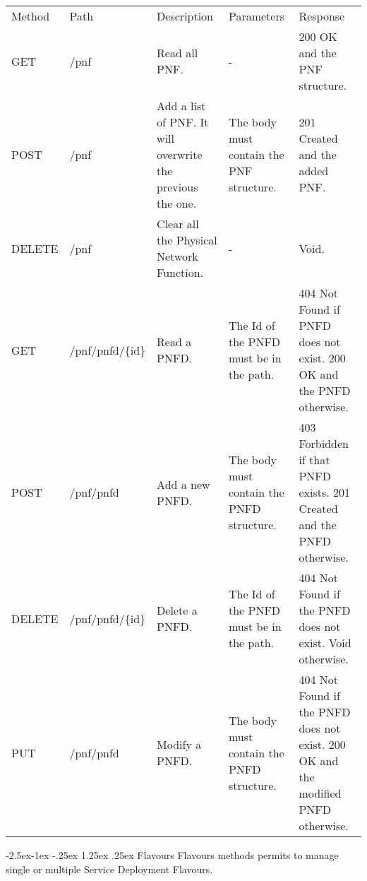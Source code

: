 \documentclass[11pt, english]{article}
\makeatletter
\renewcommand\paragraph{\@startsection{paragraph}{4}{\z@}%
            {-2.5ex\@plus -1ex \@minus -.25ex}%
            {1.25ex \@plus .25ex}%
            {\normalfont\normalsize\bfseries}}
\makeatother
\begin{document}
\begin{tabular}{ |p{2cm}|m{3cm}|p{3cm}|p{3cm}|p{4cm}| }
    \hline
    \rowcolor{black} \multicolumn{5}{|c|}{\textcolor{white}{PNF}} \\
    \hline
    \rowcolor{Gray}
    Method & Path & Description & Parameters & Response \\
    \hline
    GET   & /pnf & Read all PNF. & - & 200 OK and the PNF structure. \\
    \hline
    POST & /pnf & Add a list of PNF. It will overwrite the previous the one. & The body must contain the PNF structure. & 201 Created and the added PNF. \\
    \hline
    DELETE & /pnf & Clear all the Physical Network Function. & - & Void. \\
    \hline
    GET & /pnf/pnfd/\{id\} & Read a PNFD. & The Id of the PNFD must be in the path. & 404 Not Found if PNFD does not exist. 200 OK and the PNFD otherwise. \\
    \hline
    POST & /pnf/pnfd & Add a new PNFD. & The body must contain the PNFD structure. & 403 Forbidden if that PNFD exists. 201 Created and the PNFD otherwise. \\
    \hline
    DELETE & /pnf/pnfd/\{id\} & Delete a PNFD. & The Id of the PNFD must be in the path. & 404 Not Found if the PNFD does not exist. Void otherwise. \\
    \hline
    PUT & /pnf/pnfd & Modify a PNFD. & The body must contain the PNFD structure. & 404 Not Found if the PNFD does not exist. 200 OK and the modified PNFD otherwise. \\
    \hline
\end{tabular}

\newpage
\paragraph{Flavours}
Flavours methods permits to manage single or multiple Service Deployment Flavours. \\
\end{document}
